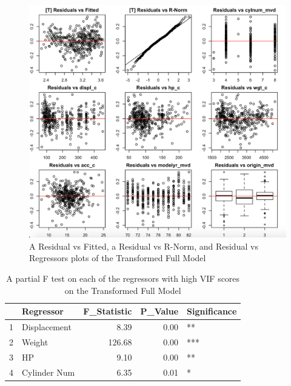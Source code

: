 \documentclass{article}
\begin{document}
\begin{figure}
	\centering
	\includegraphics[width=1\linewidth]{15-23t_resall}
	\caption[Residual Plots of the Transformed Full Model]
	{A Residual vs Fitted, a Residual vs R-Norm, and Residual vs Regressors plots of the Transformed Full Model}
\end{figure}

\clearpage
\newpage

\begin{table}[ht]
\centering
\begin{tabular}{rlrrl}
  \hline
 & Regressor & F\_Statistic & P\_Value & Significance \\ 
  \hline
1 & Displacement & 8.39 & 0.00 & ** \\ 
  2 & Weight & 126.68 & 0.00 & *** \\ 
  3 & HP & 9.10 & 0.00 & ** \\ 
  4 & Cylinder Num & 6.35 & 0.01 & * \\ 
   \hline
\end{tabular}
\caption{A partial F test on each of the regressors with high VIF scores on the Transformed Full Model}
\label{tab:partialfhighvif}
\end{table}
\end{document}
